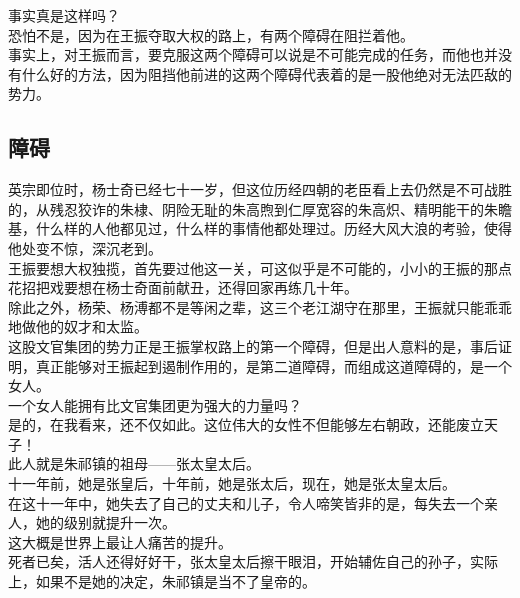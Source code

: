 \begin{multicols}{\theparacolNo}
事实真是这样吗？\\

恐怕不是，因为在王振夺取大权的路上，有两个障碍在阻拦着他。\\

事实上，对王振而言，要克服这两个障碍可以说是不可能完成的任务，而他也并没有什么好的方法，因为阻挡他前进的这两个障碍代表着的是一股他绝对无法匹敌的势力。\\

\subsection{障碍}
英宗即位时，杨士奇已经七十一岁，但这位历经四朝的老臣看上去仍然是不可战胜的，从残忍狡诈的朱棣、阴险无耻的朱高煦到仁厚宽容的朱高炽、精明能干的朱瞻基，什么样的人他都见过，什么样的事情他都处理过。历经大风大浪的考验，使得他处变不惊，深沉老到。\\

王振要想大权独揽，首先要过他这一关，可这似乎是不可能的，小小的王振的那点花招把戏要想在杨士奇面前献丑，还得回家再练几十年。\\

除此之外，杨荣、杨溥都不是等闲之辈，这三个老江湖守在那里，王振就只能乖乖地做他的奴才和太监。\\

这股文官集团的势力正是王振掌权路上的第一个障碍，但是出人意料的是，事后证明，真正能够对王振起到遏制作用的，是第二道障碍，而组成这道障碍的，是一个女人。\\

一个女人能拥有比文官集团更为强大的力量吗？\\

是的，在我看来，还不仅如此。这位伟大的女性不但能够左右朝政，还能废立天子！\\

此人就是朱祁镇的祖母——张太皇太后。\\

十一年前，她是张皇后，十年前，她是张太后，现在，她是张太皇太后。\\

在这十一年中，她失去了自己的丈夫和儿子，令人啼笑皆非的是，每失去一个亲人，她的级别就提升一次。\\

这大概是世界上最让人痛苦的提升。\\

死者已矣，活人还得好好干，张太皇太后擦干眼泪，开始辅佐自己的孙子，实际上，如果不是她的决定，朱祁镇是当不了皇帝的。\\


\end{multicols}

